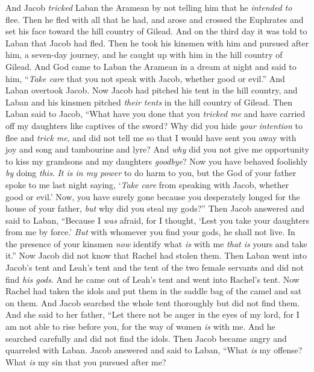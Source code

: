 \begin{biblechapter}
\verse And Jacob \textit{tricked} Laban the Aramean by not telling him that he \textit{intended to} flee.
\verse Then he fled with all that he had, and arose and crossed the Euphrates and set his face toward the hill country of Gilead.
\verse And on the third day it was told to Laban that Jacob had fled.
\verse Then he took his kinsmen with him and pursued after him, a seven-day journey, and he caught up with him in the hill country of Gilead.
\verse And God came to Laban the Aramean in a dream at night and said to him, “\textit{Take care} that you not speak with Jacob, whether good or evil.”
\verse And Laban overtook Jacob. Now Jacob had pitched his tent in the hill country, and Laban and his kinsmen pitched \textit{their tents} in the hill country of Gilead.
\verse Then Laban said to Jacob, “What have you done that you \textit{tricked me} and have carried off my daughters like captives of the sword?
\verse Why did you hide \textit{your intention} to flee and \textit{trick me}, and did not tell me so that I would have sent you away with joy and song and tambourine and lyre?
\verse And \textit{why} did you not give me opportunity to kiss my grandsons and my daughters \textit{goodbye}? Now you have behaved foolishly \textit{by} doing \textit{this}.
\verse \textit{It is in my power} to do harm to you, but the God of your father spoke to me last night saying, ‘\textit{Take care} from speaking with Jacob, whether good or evil.’
\verse Now, you have surely gone because you desperately longed for the house of your father, \textit{but} why did you steal my gods?”
\verse Then Jacob answered and said to Laban, “Because I \textit{was} afraid, for I thought, ‘Lest you take your daughters from me by force.’
\verse \textit{But} with whomever you find your gods, he shall not live. In the presence of your kinsmen \textit{now} identify what \textit{is} with me \textit{that is} yours and take it.” Now Jacob did not know that Rachel had stolen them.
\verse Then Laban went into Jacob’s tent and Leah’s tent and the tent of the two female servants and did not find \textit{his gods}. And he came out of Leah’s tent and went into Rachel’s tent.
\verse Now Rachel had taken the idols and put them in the saddle bag of the camel and sat on them. And Jacob searched the whole tent thoroughly but did not find them.
\verse And she said to her father, “Let there not be anger in the eyes of my lord, for I am not able to rise before you, for the way of women \textit{is} with me. And he searched carefully and did not find the idols.
\verse Then Jacob became angry and quarreled with Laban. Jacob answered and said to Laban, “What \textit{is} my offense? What \textit{is} my sin that you pursued after me?

\end{biblechapter}
